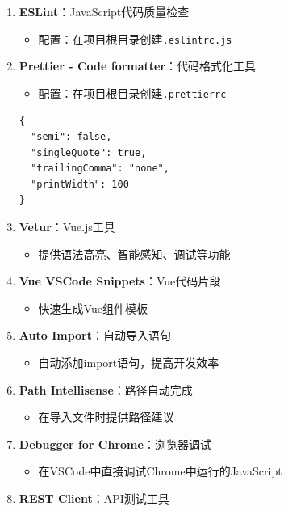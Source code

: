 \begin{enumerate}
\def\labelenumi{\arabic{enumi}.}
\tightlist
\item
  \textbf{ESLint}：JavaScript代码质量检查

  \begin{itemize}
  \tightlist
  \item
    配置：在项目根目录创建\passthrough{\lstinline!.eslintrc.js!}
  \end{itemize}
\item
  \textbf{Prettier - Code formatter}：代码格式化工具

  \begin{itemize}
  \tightlist
  \item
    配置：在项目根目录创建\passthrough{\lstinline!.prettierrc!}
  \end{itemize}

\begin{lstlisting}
{
  "semi": false,
  "singleQuote": true,
  "trailingComma": "none",
  "printWidth": 100
}
\end{lstlisting}
\item
  \textbf{Vetur}：Vue.js工具

  \begin{itemize}
  \tightlist
  \item
    提供语法高亮、智能感知、调试等功能
  \end{itemize}
\item
  \textbf{Vue VSCode Snippets}：Vue代码片段

  \begin{itemize}
  \tightlist
  \item
    快速生成Vue组件模板
  \end{itemize}
\item
  \textbf{Auto Import}：自动导入语句

  \begin{itemize}
  \tightlist
  \item
    自动添加import语句，提高开发效率
  \end{itemize}
\item
  \textbf{Path Intellisense}：路径自动完成

  \begin{itemize}
  \tightlist
  \item
    在导入文件时提供路径建议
  \end{itemize}
\item
  \textbf{Debugger for Chrome}：浏览器调试

  \begin{itemize}
  \tightlist
  \item
    在VSCode中直接调试Chrome中运行的JavaScript
  \end{itemize}
\item
  \textbf{REST Client}：API测试工具


\end{enumerate}
